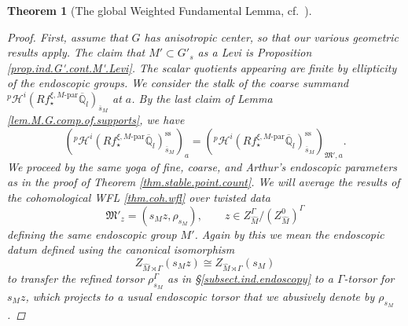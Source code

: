 \documentclass[openany]{amsbook}
\newtheorem{theorem}{Theorem}[chapter]
\theoremstyle{definition}
\theoremstyle{remark}
\numberwithin{equation}{section}
\newcommand{\Q}{\mathbb{Q}}
\newcommand{\ol}[1]{\overline{#1}}
\renewcommand{\-}{\operatorname{-}}
\newcommand{\pHi}{{}^p \mathcal{H}^i}
\newcommand{\fM}{\mathfrak{M}}
\newcommand{\Mpar}{M\text{-par}}
\renewcommand{\ss}{\mathrm{ss}}
\begin{document}
\begin{theorem}[{The global Weighted Fundamental Lemma, cf.\ \cite[Th\'eor\`eme 15.1.1]{CLII}}]
\begin{proof}
     First, assume that $G$ has anisotropic center, so that our various geometric results apply. The claim that $M' \subset G'_s$ as a Levi is Proposition \ref{prop.ind.G'.cont.M'.Levi}. The scalar quotients appearing are finite by ellipticity of the endoscopic groups. We consider the stalk of the coarse summand $\pHi(R f_\star^{\xi, \Mpar} \ol{\Q}_l)_{\ol{s}_M}$ at $a$. By the last claim of Lemma \ref{lem.M.G.comp.of.supports}, we have
    $$
        \left(\pHi(R f_\star^{\xi, \Mpar} \ol{\Q}_l)_{\ol{s}_M}^{\ss}\right)_a = \left(\pHi(R f_\star^{\xi, \Mpar} \ol{\Q}_l)_{\ol{s}_M}^{\ss}\right)_{\fM', a}.
    $$
    We proceed by the same yoga of fine, coarse, and Arthur's endoscopic parameters as in the proof of Theorem \ref{thm.stable.point.count}. We will average the results of the cohomological WFL \ref{thm.coh.wfl} over twisted data
    $$
        \fM'_z = (s_M z, \rho_{s_M}), \qquad z \in Z_{\widehat{M}}^\Gamma/(Z_{\widehat{M}}^0)^\Gamma
    $$
    defining the same endoscopic group $M'$. Again by this we mean the endoscopic datum defined using the canonical isomorphism
    $$Z_{\widehat{M} \rtimes \Gamma}(s_M z) \cong Z_{\widehat{M} \rtimes \Gamma}(s_M)$$
    to transfer the refined torsor $\rho_{s_M}^\Gamma$ as in \S \ref{subsect.ind.endoscopy} to a $\Gamma$-torsor for $s_M z$, which projects to a usual endoscopic torsor that we abusively denote by $\rho_{s_M}$.
    

\end{proof}
\end{theorem}
\end{document}
